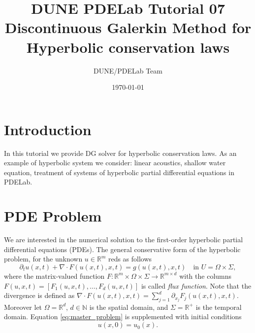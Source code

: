 \documentclass[a4paper,12pt]{article}
\title{DUNE PDELab Tutorial 07 \\
Discontinuous Galerkin Method for Hyperbolic conservation laws}
\author{DUNE/PDELab Team}
\date{\today}
\theoremstyle{definition}
\theoremstyle{definition}
\newcommand{\Dim}{d}
\begin{document}
\maketitle
\tableofcontents
\clearpage

\section{Introduction}

In this tutorial we provide  DG solver for hyperbolic conservation laws. As an example of hyperbolic system we consider: linear acoustics, shallow water equation, 
treatment of systems of hyperbolic partial differential equations in PDELab.

\section{PDE Problem}

We are interested in the numerical solution to the first-order
hyperbolic partial differential equations (PDEs). The general conservative form of the hyperbolic problem,  for  the unknown $u\in\mathbb{R}^m$
reds as follows
\begin{equation}
\label{eq:master_problem}
\partial_t u(x,t) + \nabla\cdot F(u(x,t),x,t) = g(u(x,t),x,t)  \quad\text{in $U=\Omega\times\Sigma$} ,
\end{equation}
where the matrix-valued function $F : \mathbb{R}^m\times\Omega\times\Sigma \to \mathbb{R}^{m\times \Dim}$
with the columns $F(u,x,t) = [F_1(u,x,t),\ldots,F_d(u,x,t)]$ is called \textit{flux function}.
Note that the divergence is defined as $\nabla\cdot F(u(x,t),x,t) = \sum_{j=1}^{\Dim} \partial_{x_j} F_j(u(x,t),x,t)$.
Moreover let $\Omega=\mathbb{R}^{\Dim}$, $\Dim\in\mathbb{N}$ is the spatial domain,  and $\Sigma=\mathbb{R}^+$ is the temporal domain. Equation \eqref{eq:master_problem} is supplemented with initial conditions
\begin{equation*}
u(x,0) = u_0(x) .
\end{equation*}
\end{document}
